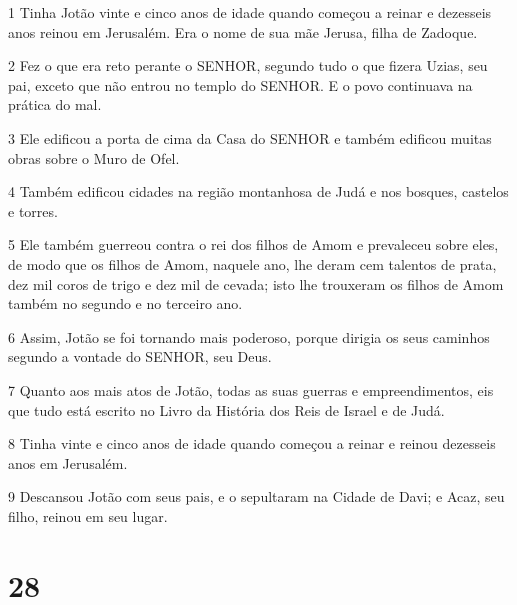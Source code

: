 \par 1 Tinha Jotão vinte e cinco anos de idade quando começou a reinar e dezesseis anos reinou em Jerusalém. Era o nome de sua mãe Jerusa, filha de Zadoque.
\par 2 Fez o que era reto perante o SENHOR, segundo tudo o que fizera Uzias, seu pai, exceto que não entrou no templo do SENHOR. E o povo continuava na prática do mal.
\par 3 Ele edificou a porta de cima da Casa do SENHOR e também edificou muitas obras sobre o Muro de Ofel.
\par 4 Também edificou cidades na região montanhosa de Judá e nos bosques, castelos e torres.
\par 5 Ele também guerreou contra o rei dos filhos de Amom e prevaleceu sobre eles, de modo que os filhos de Amom, naquele ano, lhe deram cem talentos de prata, dez mil coros de trigo e dez mil de cevada; isto lhe trouxeram os filhos de Amom também no segundo e no terceiro ano.
\par 6 Assim, Jotão se foi tornando mais poderoso, porque dirigia os seus caminhos segundo a vontade do SENHOR, seu Deus.
\par 7 Quanto aos mais atos de Jotão, todas as suas guerras e empreendimentos, eis que tudo está escrito no Livro da História dos Reis de Israel e de Judá.
\par 8 Tinha vinte e cinco anos de idade quando começou a reinar e reinou dezesseis anos em Jerusalém.
\par 9 Descansou Jotão com seus pais, e o sepultaram na Cidade de Davi; e Acaz, seu filho, reinou em seu lugar.

\chapter{28}

